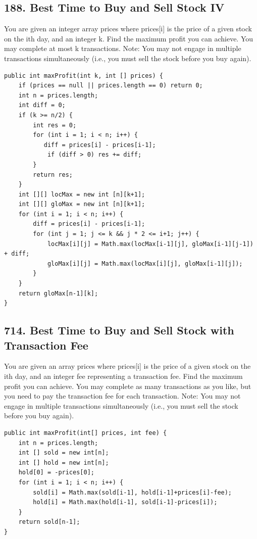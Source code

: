 \documentclass[9pt, b5paper]{article}
\begin{document}
\subsection{188. Best Time to Buy and Sell Stock IV}
\label{sec-4-28}
You are given an integer array prices where prices[i] is the price of a given stock on the ith day, and an integer k.
Find the maximum profit you can achieve. You may complete at most k transactions.
Note: You may not engage in multiple transactions simultaneously (i.e., you must sell the stock before you buy again).
\begin{verbatim}
public int maxProfit(int k, int [] prices) {
    if (prices == null || prices.length == 0) return 0;
    int n = prices.length;
    int diff = 0;
    if (k >= n/2) {
        int res = 0;
        for (int i = 1; i < n; i++) {
           diff = prices[i] - prices[i-1];
            if (diff > 0) res += diff;
        }
        return res;
    }
    int [][] locMax = new int [n][k+1];
    int [][] gloMax = new int [n][k+1];
    for (int i = 1; i < n; i++) {
        diff = prices[i] - prices[i-1];
        for (int j = 1; j <= k && j * 2 <= i+1; j++) {
            locMax[i][j] = Math.max(locMax[i-1][j], gloMax[i-1][j-1]) + diff;
            gloMax[i][j] = Math.max(locMax[i][j], gloMax[i-1][j]);
        }
    }
    return gloMax[n-1][k];
}
\end{verbatim}

\subsection{714. Best Time to Buy and Sell Stock with Transaction Fee}
\label{sec-4-29}
You are given an array prices where prices[i] is the price of a given stock on the ith day, and an integer fee representing a transaction fee.
Find the maximum profit you can achieve. You may complete as many transactions as you like, but you need to pay the transaction fee for each transaction.
Note: You may not engage in multiple transactions simultaneously (i.e., you must sell the stock before you buy again).
\begin{verbatim}
public int maxProfit(int[] prices, int fee) {
    int n = prices.length;
    int [] sold = new int[n];
    int [] hold = new int[n];
    hold[0] = -prices[0];
    for (int i = 1; i < n; i++) {
        sold[i] = Math.max(sold[i-1], hold[i-1]+prices[i]-fee);
        hold[i] = Math.max(hold[i-1], sold[i-1]-prices[i]);
    }
    return sold[n-1];
}
\end{verbatim}
\end{document}
